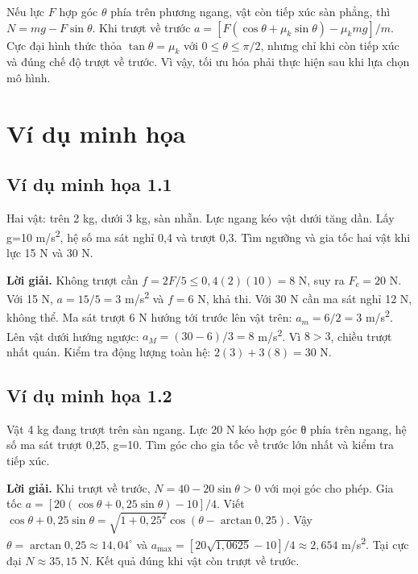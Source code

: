 \documentclass[11pt,a4paper,openany]{book}
\begin{document}
Nếu lực $F$ hợp góc $\theta$ phía trên phương ngang, vật còn tiếp xúc sàn phẳng, thì $N=mg-F\sin\theta$. Khi trượt về trước $a=[F(\cos\theta+\mu_k\sin\theta)-\mu_kmg]/m$. Cực đại hình thức thỏa $\tan\theta=\mu_k$ với $0\le\theta\le\pi/2$, nhưng chỉ khi còn tiếp xúc và đúng chế độ trượt về trước. Vì vậy, tối ưu hóa phải thực hiện sau khi lựa chọn mô hình.
\begin{center}
\end{center}
\section{Ví dụ minh họa}
\subsection*{Ví dụ minh họa 1.1}
Hai vật: trên 2 kg, dưới 3 kg, sàn nhẵn. Lực ngang kéo vật dưới tăng dần. Lấy g=10 m/s\textsuperscript{2}, hệ số ma sát nghỉ 0,4 và trượt 0,3. Tìm ngưỡng và gia tốc hai vật khi lực 15 N và 30 N.

\textbf{Lời giải.} Không trượt cần $f=2F/5\le0{,}4(2)(10)=8$ N, suy ra $F_c=20$ N. Với 15 N, $a=15/5=3$ m/s\textsuperscript{2} và $f=6$ N, khả thi. Với 30 N cần ma sát nghỉ 12 N, không thể. Ma sát trượt 6 N hướng tới trước lên vật trên: $a_m=6/2=3$ m/s\textsuperscript{2}. Lên vật dưới hướng ngược: $a_M=(30-6)/3=8$ m/s\textsuperscript{2}. Vì $8>3$, chiều trượt nhất quán. Kiểm tra động lượng toàn hệ: $2(3)+3(8)=30$ N.
\subsection*{Ví dụ minh họa 1.2}
Vật 4 kg đang trượt trên sàn ngang. Lực 20 N kéo hợp góc θ phía trên ngang, hệ số ma sát trượt 0,25, g=10. Tìm góc cho gia tốc về trước lớn nhất và kiểm tra tiếp xúc.

\textbf{Lời giải.} Khi trượt về trước, $N=40-20\sin\theta>0$ với mọi góc cho phép. Gia tốc $a=[20(\cos\theta+0{,}25\sin\theta)-10]/4$. Viết $\cos\theta+0{,}25\sin\theta=\sqrt{1+0{,}25^2}\cos(\theta-\arctan0{,}25)$. Vậy $\theta=\arctan0{,}25\approx14{,}04^\circ$ và $a_{\max}=[20\sqrt{1{,}0625}-10]/4\approx2{,}654$ m/s\textsuperscript{2}. Tại cực đại $N\approx35{,}15$ N. Kết quả đúng khi vật còn trượt về trước.
\end{document}
